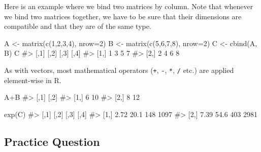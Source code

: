 \documentclass[
  letterpaper,
]{krantz}
\makeatletter
\newenvironment{Shaded}{\begin{snugshade}}{\end{snugshade}}
\newcommand{\AttributeTok}[1]{\textcolor[rgb]{0.40,0.45,0.13}{#1}}
\newcommand{\CommentTok}[1]{\textcolor[rgb]{0.37,0.37,0.37}{#1}}
\newcommand{\DecValTok}[1]{\textcolor[rgb]{0.68,0.00,0.00}{#1}}
\newcommand{\FunctionTok}[1]{\textcolor[rgb]{0.28,0.35,0.67}{#1}}
\newcommand{\NormalTok}[1]{\textcolor[rgb]{0.00,0.23,0.31}{#1}}
\newcommand{\OtherTok}[1]{\textcolor[rgb]{0.00,0.23,0.31}{#1}}
\newcommand{\SpecialCharTok}[1]{\textcolor[rgb]{0.37,0.37,0.37}{#1}}
\newenvironment{kframe}{%
\medskip{}
\setlength{\fboxsep}{.8em}
 \def\at@end@of@kframe{}%
 \ifinner\ifhmode%
  \def\at@end@of@kframe{\end{minipage}}%
  \begin{minipage}{\columnwidth}%
 \fi\fi%
 \def\FrameCommand##1{\hskip\@totalleftmargin \hskip-\fboxsep
 \colorbox{shadecolor}{##1}\hskip-\fboxsep
     \hskip-\linewidth \hskip-\@totalleftmargin \hskip\columnwidth}%
 \MakeFramed {\advance\hsize-\width
   \@totalleftmargin\z@ \linewidth\hsize
   \@setminipage}}%
 {\par\unskip\endMakeFramed%
 \at@end@of@kframe}
\renewenvironment{Shaded}{\begin{kframe}}{\end{kframe}}
\makeatother
\begin{document}
Here is an example where we bind two matrices by column. Note that
whenever we bind two matrices together, we have to be sure that their
dimensions are compatible and that they are of the same type.

\begin{Shaded}
\begin{Highlighting}[]
\NormalTok{A }\OtherTok{\textless{}{-}} \FunctionTok{matrix}\NormalTok{(}\FunctionTok{c}\NormalTok{(}\DecValTok{1}\NormalTok{,}\DecValTok{2}\NormalTok{,}\DecValTok{3}\NormalTok{,}\DecValTok{4}\NormalTok{), }\AttributeTok{nrow=}\DecValTok{2}\NormalTok{)}
\NormalTok{B }\OtherTok{\textless{}{-}} \FunctionTok{matrix}\NormalTok{(}\FunctionTok{c}\NormalTok{(}\DecValTok{5}\NormalTok{,}\DecValTok{6}\NormalTok{,}\DecValTok{7}\NormalTok{,}\DecValTok{8}\NormalTok{), }\AttributeTok{nrow=}\DecValTok{2}\NormalTok{)}
\NormalTok{C }\OtherTok{\textless{}{-}} \FunctionTok{cbind}\NormalTok{(A, B)}
\NormalTok{C}
\CommentTok{\#\textgreater{}      [,1] [,2] [,3] [,4]}
\CommentTok{\#\textgreater{} [1,]    1    3    5    7}
\CommentTok{\#\textgreater{} [2,]    2    4    6    8}
\end{Highlighting}
\end{Shaded}

As with vectors, most mathematical operators (\texttt{+}, \texttt{-},
\texttt{*}, \texttt{/} etc.) are applied element-wise in R.

\begin{Shaded}
\begin{Highlighting}[]
\NormalTok{A}\SpecialCharTok{+}\NormalTok{B}
\CommentTok{\#\textgreater{}      [,1] [,2]}
\CommentTok{\#\textgreater{} [1,]    6   10}
\CommentTok{\#\textgreater{} [2,]    8   12}
\end{Highlighting}
\end{Shaded}

\begin{Shaded}
\begin{Highlighting}[]
\FunctionTok{exp}\NormalTok{(C)}
\CommentTok{\#\textgreater{}      [,1] [,2] [,3] [,4]}
\CommentTok{\#\textgreater{} [1,] 2.72 20.1  148 1097}
\CommentTok{\#\textgreater{} [2,] 7.39 54.6  403 2981}
\end{Highlighting}
\end{Shaded}

\subsection{Practice Question}\label{practice-question-1}
\end{document}
